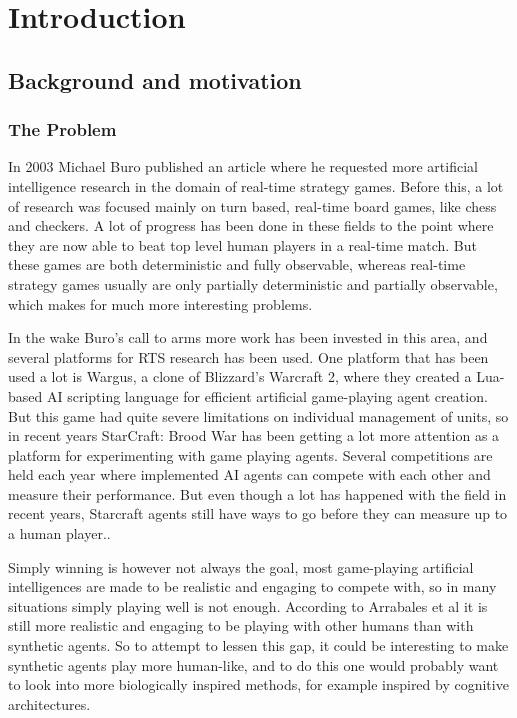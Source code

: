 
\chapter{Introduction}

\section{Background and motivation}

\subsection{The Problem}
In 2003 Michael Buro published an article where he requested more artificial
intelligence research in the domain of real-time strategy
games.\cite{buro2003real} Before this, a lot of research was focused mainly on
turn based, real-time board games, like chess and checkers. A lot of
progress has been done in these fields to the point where they are now able to
beat top level human players in a real-time match. \cite{campbell2002deep} But
these games are both deterministic and fully observable, whereas real-time
strategy games usually are only partially deterministic and partially
observable, which makes for much more interesting problems.

In the wake Buro's call to arms more work has been invested in this area, and
several platforms for RTS research has been used. One platform that has been
used a lot is Wargus\cite{wargus}, a clone of Blizzard's Warcraft 2, where they
created a Lua-based AI scripting language for efficient artificial game-playing
agent creation. But this game had quite severe limitations on individual
management of units, so in recent years StarCraft: Brood War has been getting a
lot more attention as a platform for experimenting with game playing agents.
Several competitions are held each year where implemented AI agents can
compete with each other and measure their performance. But even though a lot has
happened with the field in recent years, Starcraft agents still have ways to go
before they can measure up to a human player.\cite{eisbotvsfong}.

Simply winning is however not always the goal, most game-playing artificial
intelligences are made to be realistic and engaging to compete with, so in many
situations simply playing well is not enough. According to Arrabales et
al \cite{arrabales2009gamechars} it is still more realistic and engaging to be
playing with other humans than with synthetic agents. So to attempt to lessen
this gap, it could be interesting to make synthetic agents play more human-like,
and to do this one would probably want to look into more biologically inspired
methods, for example inspired by cognitive architectures.

